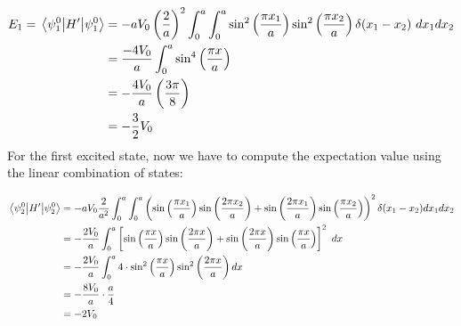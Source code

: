 \documentclass[10pt]{article}
\begin{document}
\begin{enumerate}[label=(\alph*)]
\begin{solution}
            \begin{align*}
                E_1 = \expval{H'}{\psi_1^0} &= -aV_0 \left( \frac 2a\right)^2 \int_0^a \int_0^a \sin^2 \left(\frac{\pi x_1}{a}\right) \sin^2 \left( \frac{\pi x_2}{a}\right) \delta(x_1 - x_2) \ dx_1 dx_2\\
                &= \frac{-4V_0}{a} \int_0^a \sin^4 \left( \frac{\pi x}{a}\right) \\
                &= -\frac{4V_0}{a} \left( \frac{3\pi }{8}\right) \\
                &= -\frac{3}{2} V_0
            \end{align*}
            For the first excited state, now we have to compute the expectation value using the linear combination of states:

            \begin{align*}
                \expval{H'}{\psi_2^0} &= -aV_0\frac{2}{a^2}\int_{0}^{a}\int_{0}^{a}\left(\sin\left(\frac{\pi x_1}{a}\right)\sin\left(\frac{2\pi x_2}{a}\right) + \sin\left(\frac{2\pi x_1}{a}\right)\sin\left(\frac{\pi x_2}{a}\right)\right)^2\delta(x_1-x_2)dx_1dx_2\\
                &= -\frac{2V_0}{a} \int_0^a \left[\sin\left(\frac{\pi x}{a}\right)\sin\left(\frac{2\pi x}{a}\right) + \sin\left(\frac{2\pi x}{a}\right)\sin\left(\frac{\pi x}{a}\right)\right]^2 \ dx\\
                &= -\frac{2V_0}{a} \int_0^a 4 \cdot \sin^2 \left( \frac{\pi x}{a}\right) \sin^2 \left( \frac{2\pi x}{a}\right) dx\\
                &= -\frac{8V_0}{a} \cdot \frac{a}{4}\\
                &= -2V_0
            \end{align*}
        \end{solution}
    \end{enumerate}

    \pagebreak
\end{document}
